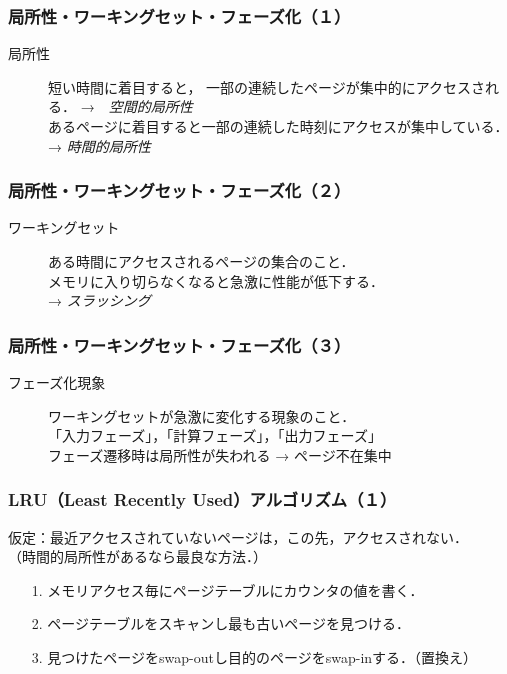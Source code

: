 \documentclass[handout]{beamer}                   %
\begin{document}
\begin{frame}
  \frametitle{局所性・ワーキングセット・フェーズ化（１）}
  \begin{description}
  \item[局所性]
    短い時間に着目すると，
    一部の連続したページが集中的にアクセスされる．
    →　\emph{空間的局所性}\\
    あるページに着目すると一部の連続した時刻にアクセスが集中している．
    → \emph{時間的局所性}
  \end{description}
\end{frame}

\begin{frame}
  \frametitle{局所性・ワーキングセット・フェーズ化（２）}
  \begin{description}
  \item[ワーキングセット]
    ある時間にアクセスされるページの集合のこと．\\
    メモリに入り切らなくなると急激に性能が低下する．\\
    → \emph{スラッシング}
  \end{description}
\end{frame}

\begin{frame}
  \frametitle{局所性・ワーキングセット・フェーズ化（３）}
  \begin{description}
  \item[フェーズ化現象]
    ワーキングセットが急激に変化する現象のこと．\\
    「入力フェーズ」，「計算フェーズ」，「出力フェーズ」 \\
    フェーズ遷移時は局所性が失われる → ページ不在集中
\end{description}
\end{frame}

\begin{frame}
  \frametitle{LRU（Least Recently Used）アルゴリズム（１）}
  仮定：最近アクセスされていないページは，この先，アクセスされない．\\
  （時間的局所性があるなら最良な方法．）
  \vspace{3mm}
  \begin{enumerate}
  \item[1.] メモリアクセス毎にページテーブルにカウンタの値を書く．
  \item[2.] ページテーブルをスキャンし最も古いページを見つける．
  \item[3.] 見つけたページをswap-outし目的のページをswap-inする．（置換え）
  \end{enumerate}
\end{frame}
\end{document}
